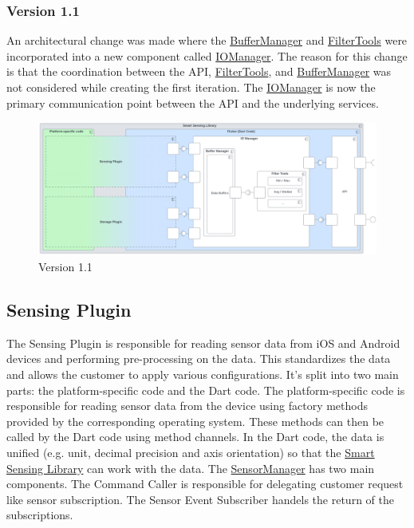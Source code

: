\documentclass[12pt]{article}
\newcounter{fr}
\begin{document}
\subsubsection{Version 1.1}
An architectural change was made where the \hyperref[sec:BufferManager]{BufferManager} and \hyperref[sec:FilterTools]{FilterTools} were incorporated into a new component called \hyperref[sec:IOManager]{IOManager}.
The reason for this change is that the coordination between the API, \hyperref[sec:FilterTools]{FilterTools}, and \hyperref[sec:BufferManager]{BufferManager} was not considered while creating the first iteration. The \hyperref[sec:CIOManager]{IOManager} is now the primary communication point between the API and the underlying services.
\begin{figure}[ht]
\includegraphics[width=1\textwidth]{Graphics/SmartSensingLibraryNew.png}
\caption{\label{fig:bild2} Version 1.1}
\end{figure}
\newpage
\subsection{Sensing Plugin}
\label{sec:SensingPlugin}
The Sensing Plugin is responsible for reading sensor data from iOS and Android devices and performing pre-processing on the data. This standardizes the data and allows the customer to apply various configurations. It's split into two main parts: the platform-specific code and the Dart code. The platform-specific code is responsible for reading sensor data from the device using factory methods provided by the corresponding operating system. These methods can then be called by the Dart code using method channels. In the Dart code, the data is unified (e.g. unit, decimal precision and axis orientation) so that the \hyperref[sec:SmartSensingLibrary]{Smart Sensing Library} can work with the data. The \hyperref[sec:CSensorManager]{SensorManager} has two main components. The Command Caller is responsible for delegating customer request like sensor subscription. The Sensor Event Subscriber handels the return of the subscriptions.
\end{document}
